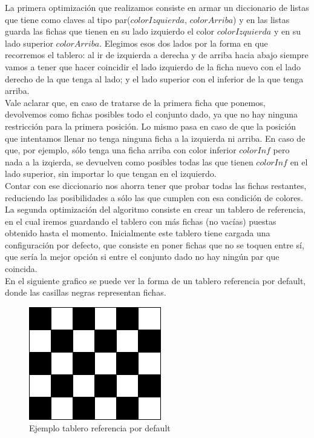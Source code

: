 La primera optimizaci\'on que realizamos consiste en armar un diccionario de listas que tiene como claves al tipo par($colorIzquierda$, $colorArriba$) y en las listas guarda las fichas que tienen en su lado izquierdo el color $colorIzquierda$ y en su lado superior $colorArriba$. Elegimos esos dos lados por la forma en que recorremos el tablero: al ir de izquierda a derecha y de arriba hacia abajo siempre vamos a tener que hacer coincidir el lado izquierdo de la ficha nuevo con el lado derecho de la que tenga al lado; y el lado superior con el inferior de la que tenga arriba.\\
Vale aclarar que, en caso de tratarse de la primera ficha que ponemos, devolvemos como fichas posibles todo el conjunto dado, ya que no hay ninguna restricci\'on para la primera posici\'on. Lo mismo pasa en caso de que la posici\'on que intentamos llenar no tenga ninguna ficha a la izquierda ni arriba. En caso de que, por ejemplo, s\'olo tenga una ficha arriba con color inferior $colorInf$ pero nada a la izqierda, se devuelven como posibles todas las que tienen $colorInf$ en el lado superior, sin importar lo que tengan en el izquierdo.\\
Contar con ese diccionario nos ahorra tener que probar todas las fichas restantes, reduciendo las posibilidades a s\'olo las que cumplen con esa condici\'on de colores.\\

La segunda optimizaci\'on del algoritmo consiste en crear un tablero de referencia, en el cual iremos guardando el tablero con m\'as fichas (no vac\'ias) puestas obtenido hasta el momento. Inicialmente este tablero tiene cargada una configuraci\'on por defecto, que consiste en poner fichas que no se toquen entre s\'i, que ser\'ia la mejor opci\'on si entre el conjunto dado no hay ning\'un par que coincida.\\
En el siguiente grafico se puede ver la forma de un tablero referencia por default, donde las casillas negras representan fichas.\\

\begin{figure}[h]
\begin{center}
\includegraphics[scale=0.4]{./img/fichasIntercaladas.png}
\caption{Ejemplo tablero referencia por default}
\end{center}
\end{figure}

